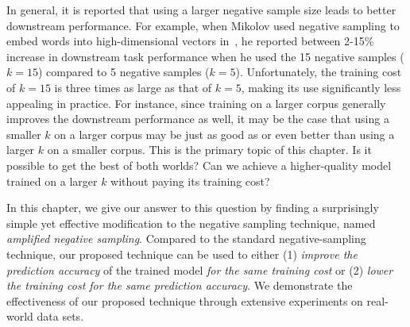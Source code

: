 In general, it is reported that using a larger negative sample size leads to better downstream performance. For example, when Mikolov used negative sampling to embed words into high-dimensional vectors in~\citep{mikolov2013distributed}, he reported between 2-15\% increase in downstream task performance when he used the 15 negative samples ($k=15$) compared to 5 negative samples ($k=5$). Unfortunately, the training cost of $k=15$ is three times as large as that of $k=5$, making its use significantly less appealing in practice. For instance, since training on a larger corpus generally improves the downstream performance as well, it may be the case that using a smaller $k$ on a larger corpus may be just as good as or even better than using a larger $k$ on a smaller corpus. This is the primary topic of this chapter. Is it possible to get the best of both worlds? Can we achieve a higher-quality model trained on a larger $k$ without paying its training cost?


In this chapter, we give our answer to this question by finding a surprisingly simple yet effective  modification to the negative sampling technique, named \emph{amplified negative sampling}.  Compared to the standard negative-sampling technique, our proposed technique can be used to either (1) \emph{improve the prediction accuracy} of the trained model \emph{for the same training cost} or (2) \emph{lower the training cost for the same prediction accuracy}. We demonstrate the effectiveness of our proposed technique through extensive experiments on real-world data sets.

